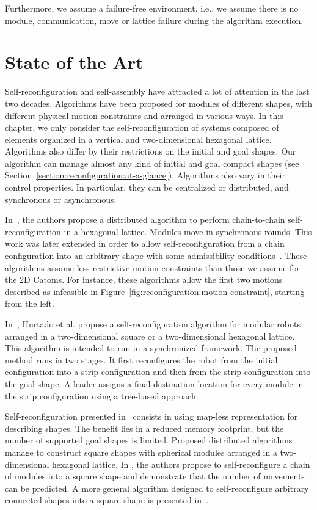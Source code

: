 Furthermore, we assume a failure-free environment, i.e., we assume there is no module, communication, move or lattice failure during the algorithm execution.

\section{State of the Art}
\label{section:reconfiguration:related-work}

Self-reconfiguration and self-assembly have attracted a lot of attention in the last two decades. Algorithms have been proposed for modules of different shapes, with different physical motion constraints and arranged in various ways. In this chapter, we only consider the self-reconfiguration of systems composed of elements organized in a vertical and two-dimensional hexagonal lattice. Algorithms also differ by their restrictions on the initial and goal shapes. Our algorithm can manage almost any kind of initial and goal compact shapes (see Section~\ref{section:reconfiguration:at-a-glance}). Algorithms also vary in their control properties. In particular, they can be centralized or distributed, and synchronous or asynchronous.

In~\cite{walter2000distributed}, the authors propose a distributed algorithm to perform chain-to-chain self-reconfiguration in a hexagonal lattice. Modules move in synchronous rounds. This work was later extended in order to allow self-reconfiguration from a chain configuration into an arbitrary shape with some admissibility conditions~\cite{walter2005algorithms,bateau2012increasing}. These algorithms assume less restrictive motion constraints than those we assume for the 2D Catoms. For instance, these algorithms allow the first two motions described as infeasible in Figure~\ref{fig:reconfiguration:motion-constraint}, starting from the left.

In~\cite{hurtado2013distributed}, Hurtado et al. propose a self-reconfiguration algorithm for modular robots arranged in a two-dimensional square or a two-dimensional hexagonal lattice. This algorithm is intended to run in a synchronized framework. The proposed method runs in two stages. It first reconfigures the robot from the initial configuration into a strip configuration and then from the strip configuration into the goal shape. A leader assigns a final destination location for every module in the strip configuration using a tree-based approach.

Self-reconfiguration presented in~\cite{lakhlef2014optimization,lakhlef2015energy,lakhlef2015fast} consists in using map-less representation for describing shapes. The benefit lies in a reduced memory footprint, but the number of supported goal shapes is limited. Proposed distributed algorithms manage to construct square shapes with spherical modules arranged in a two-dimensional hexagonal lattice. In \cite{lakhlef2015energy,lakhlef2015fast}, the authors propose to self-reconfigure a chain of modules into a square shape and demonstrate that the number of movements can be predicted. A more general algorithm designed to self-reconfigure arbitrary connected shapes into a square shape is presented in~\cite{lakhlef2014optimization}.

